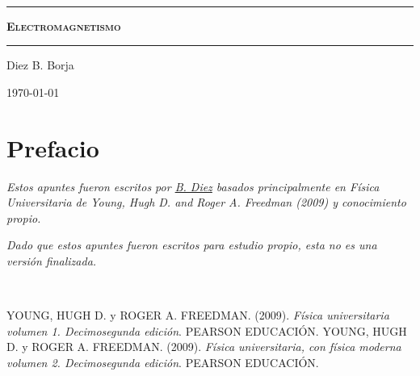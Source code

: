 \documentclass[letterpaper, onecolumn, 11pt]{report}
\begin{document}
\sffamily
\begin{center}

\

\vspace{6.5cm}

\rule{15cm}{0.1cm}

\vspace{1.5cm}

{\huge \textsc{\textbf{Electromagnetismo}}}

\vspace{1.5cm}

\rule{15cm}{0.1cm}

\vspace{1.5cm}
Diez B. Borja

\today

\newpage
\setcounter{page}{1}

\pagestyle{plain}
\chapter*{Prefacio}
\bigskip
\bigskip
\bigskip
\bigskip
\bigskip
\bigskip


\emph{Estos apuntes fueron escritos por \href{https://github.com/10BlackHole}{B. Diez} basados principalmente en Física Universitaria de Young, Hugh D. and Roger A. Freedman (2009) y conocimiento propio.}

\emph{Dado que estos apuntes fueron escritos para estudio propio, esta no es una versión finalizada.}
\bigskip


\bigskip

\newpage
\end{center}
\\
\tableofcontents
{}
\setcounter{page}{1}







%


\appendix


\newpage
\begin{thebibliography}{}
YOUNG, HUGH D. y ROGER A. FREEDMAN. (2009). \textit{Física universitaria volumen 1. Decimosegunda edición}. PEARSON EDUCACIÓN.
 YOUNG, HUGH D. y ROGER A. FREEDMAN. (2009). \textit{Física universitaria, con física moderna volumen 2.
Decimosegunda edición}. PEARSON EDUCACIÓN.

\end{thebibliography}
\end{document}
